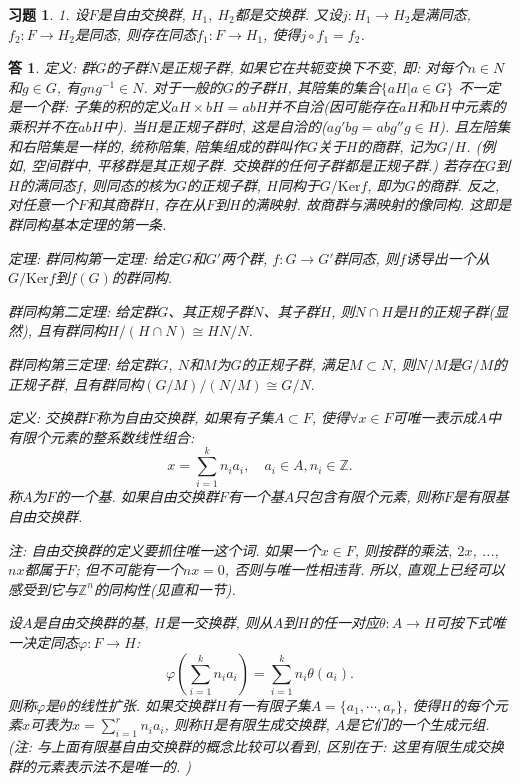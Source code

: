 \documentclass{ctexart}%
\newtheorem*{exercise}{习题}
\newtheorem*{solution}{答}
\theoremstyle{definition}
\theoremstyle{remark}
\begin{document}
\begin{exercise}1. 设$F$是自由交换群, $H_1$, $H_2$都是交换群. 又设$j:H_1\rightarrow H_2$是满同态, $f_2:F\rightarrow H_2$是同态, 则存在同态$f_1 : F\rightarrow H_1$, 使得$j\circ f_1= f_2$.
\end{exercise}
\begin{solution}
定义: 群$G$的子群$N$是正规子群, 如果它在共轭变换下不变, 即: 对每个$n\in N$和$g\in G$, 有$gng^{-1}\in N$. 对于一般的$G$的子群$H$, 其陪集的集合$\{a H|a\in G\}$ 不一定是一个群: 子集的积的定义$aH\times bH=ab H$并不自洽(因可能存在$aH$和$bH$中元素的乘积并不在$abH$中). 当$H$是正规子群时, 这是自洽的($ag'bg=abg''g\in H$). 且左陪集和右陪集是一样的, 统称陪集, 陪集组成的群叫作$G$关于$H$的商群, 记为$G/H$. (例如, 空间群中, 平移群是其正规子群. 交换群的任何子群都是正规子群.) 若存在$G$到$H$的满同态$f$, 则同态的核为$G$的正规子群, $H$同构于$G/\text{Ker} f$, 即为$G$的商群. 反之, 对任意一个$F$和其商群$H$, 存在从$F$到$H$的满映射. 故商群与满映射的像同构. 这即是群同构基本定理的第一条.

定理: 群同构第一定理: 给定$G$和$G'$两个群, $f:G\rightarrow G'$群同态, 则$f$诱导出一个从$G/\text{Ker}f$到$f(G)$的群同构. 

群同构第二定理: 给定群$G$、其正规子群$N$、其子群$H$, 则$N\cap H$是$H$的正规子群(显然),  且有群同构$H/(H\cap N) \cong HN/N$. 

群同构第三定理: 给定群$G$, $N$和$M$为$G$的正规子群, 满足$M\subset N$, 则$N/M$是$G/M$的正规子群, 且有群同构$(G/M)/(N/M)\cong G/N.$
  

定义: 交换群$F$称为自由交换群, 如果有子集$A\subset F$, 使得$\forall x\in F$可唯一表示成$A$中有限个元素的整系数线性组合: 
$$x= \sum\limits_{i=1}^k n_ia_i, \quad a_i\in A, n_i\in\mathbb{Z}.$$
称$A$为$F$的一个基. 如果自由交换群$F$有一个基$A$只包含有限个元素, 则称$F$是有限基自由交换群. 

注: 自由交换群的定义要抓住唯一这个词. 如果一个$x\in F$, 则按群的乘法, $2x$, ...,$nx$都属于$F$; 但不可能有一个$nx=0$, 否则与唯一性相违背. 所以, 直观上已经可以感受到它与$\mathbb{Z}^n$的同构性(见直和一节). 

设$A$是自由交换群的基, $H$是一交换群, 则从$A$到$H$的任一对应$\theta: A\rightarrow H$可按下式唯一决定同态$\varphi: F\rightarrow H$: 
$$\varphi(\sum_{i=1}^k n_i a_i) = \sum_{i=1}^k n_i\theta(a_i).$$
则称$\varphi$是$\theta$的线性扩张. 如果交换群$H$有一有限子集$A= \{a_1,\cdots,a_r\}$, 使得$H$的每个元素$x$可表为$x= \sum_{i=1}^rn_ia_i$, 则称$H$是有限生成交换群, $A$是它们的一个生成元组. (注: 与上面有限基自由交换群的概念比较可以看到, 区别在于: 这里有限生成交换群的元素表示法不是唯一的. )


\end{solution}
\end{document}
